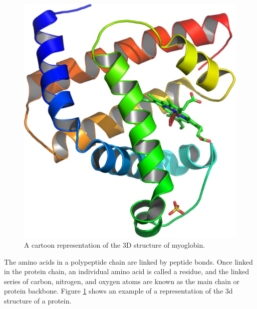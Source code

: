 \documentclass[a4paper,12pt,english]{report}
\begin{document}
\begin{figure}[!ht]
\begin{center}
\includegraphics [bb= 0 0 380 380]{images/Myoglobin.jpg}
\end{center}
\caption{A cartoon representation of the 3D structure of myoglobin.}
\label{myoglobin}
\end{figure}

The amino acids in a polypeptide chain are linked by peptide bonds. Once linked in the protein chain, an individual amino acid is called a residue, and the linked series of carbon, nitrogen, and oxygen atoms are known as the main chain or protein backbone\cite{murrayetal}. Figure \ref{myoglobin} shows an example of a representation of the 3d structure of a protein.

% 
\end{document}
